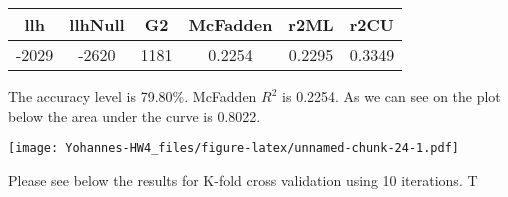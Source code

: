 \documentclass[]{article}
\begin{document}
\begin{longtable}[]{@{}cccccc@{}}
\toprule
\begin{minipage}[b]{0.09\columnwidth}\centering\strut
llh\strut
\end{minipage} & \begin{minipage}[b]{0.12\columnwidth}\centering\strut
llhNull\strut
\end{minipage} & \begin{minipage}[b]{0.08\columnwidth}\centering\strut
G2\strut
\end{minipage} & \begin{minipage}[b]{0.13\columnwidth}\centering\strut
McFadden\strut
\end{minipage} & \begin{minipage}[b]{0.10\columnwidth}\centering\strut
r2ML\strut
\end{minipage} & \begin{minipage}[b]{0.10\columnwidth}\centering\strut
r2CU\strut
\end{minipage}\tabularnewline
\midrule
\endhead
\begin{minipage}[t]{0.09\columnwidth}\centering\strut
-2029\strut
\end{minipage} & \begin{minipage}[t]{0.12\columnwidth}\centering\strut
-2620\strut
\end{minipage} & \begin{minipage}[t]{0.08\columnwidth}\centering\strut
1181\strut
\end{minipage} & \begin{minipage}[t]{0.13\columnwidth}\centering\strut
0.2254\strut
\end{minipage} & \begin{minipage}[t]{0.10\columnwidth}\centering\strut
0.2295\strut
\end{minipage} & \begin{minipage}[t]{0.10\columnwidth}\centering\strut
0.3349\strut
\end{minipage}\tabularnewline
\bottomrule
\end{longtable}

The accuracy level is 79.80\%. McFadden \(R^2\) is 0.2254. As we can see
on the plot below the area under the curve is 0.8022.

\texttt{[image: Yohannes-HW4\_files/figure-latex/unnamed-chunk-24-1.pdf]}

Please see below the results for K-fold cross validation using 10
iterations. T
\end{document}
